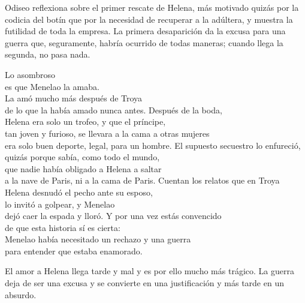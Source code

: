 Odiseo reflexiona sobre el primer rescate de Helena, más motivado quizás por la codicia del botín que por la necesidad de recuperar a la adúltera, y muestra la futilidad de toda la empresa. La primera desaparición da la excusa para una guerra que, seguramente, habría ocurrido de todas maneras; cuando llega la segunda, no pasa nada.

\begin{versopropio}
Lo asombroso\\
es que Menelao la amaba.\\
La amó mucho más después de Troya\\
de lo que la había amado nunca antes.
\stanzabreak
Después de la boda,\\
Helena era solo un trofeo, y que el príncipe,\\
tan joven y furioso, se llevara a la cama a otras mujeres\\
era solo buen deporte, legal, para un hombre.
\stanzabreak
El supuesto secuestro lo enfureció,\\
quizás porque sabía, como todo el mundo,\\
que nadie había obligado a Helena a saltar\\
a la nave de Paris, ni a la cama de Paris.
\stanzabreak
Cuentan los relatos que en Troya\\
Helena desnudó el pecho ante su esposo,\\
lo invitó a golpear, y Menelao\\
dejó caer la espada y lloró.
\stanzabreak
Y por una vez estás convencido\\
de que esta historia sí es cierta:\\
Menelao había necesitado un rechazo y una guerra\\
para entender que estaba enamorado.
\end{versopropio}

El amor a Helena llega tarde y mal y es por ello mucho más trágico. La guerra deja de ser una excusa y se convierte en una justificación y más tarde en un absurdo.

